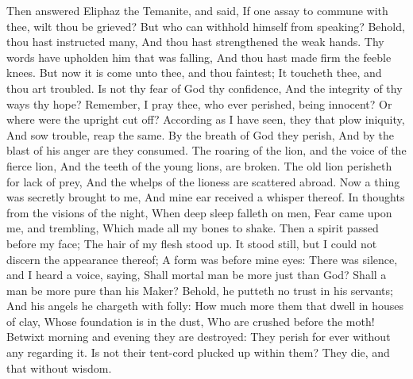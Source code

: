 Then answered Eliphaz the Temanite, and said,  If one assay to commune with thee, wilt thou be grieved? But who can withhold himself from speaking?  Behold, thou hast instructed many, And thou hast strengthened the weak hands.  Thy words have upholden him that was falling, And thou hast made firm the feeble knees.  But now it is come unto thee, and thou faintest; It toucheth thee, and thou art troubled.  Is not thy fear of God thy confidence, And the integrity of thy ways thy hope?  Remember, I pray thee, who ever perished, being innocent? Or where were the upright cut off?  According as I have seen, they that plow iniquity, And sow trouble, reap the same.  By the breath of God they perish, And by the blast of his anger are they consumed.  The roaring of the lion, and the voice of the fierce lion, And the teeth of the young lions, are broken.  The old lion perisheth for lack of prey, And the whelps of the lioness are scattered abroad.  Now a thing was secretly brought to me, And mine ear received a whisper thereof.  In thoughts from the visions of the night, When deep sleep falleth on men,  Fear came upon me, and trembling, Which made all my bones to shake.  Then a spirit passed before my face; The hair of my flesh stood up.  It stood still, but I could not discern the appearance thereof; A form was before mine eyes: There was silence, and I heard a voice, saying,  Shall mortal man be more just than God? Shall a man be more pure than his Maker?  Behold, he putteth no trust in his servants; And his angels he chargeth with folly:  How much more them that dwell in houses of clay, Whose foundation is in the dust, Who are crushed before the moth!  Betwixt morning and evening they are destroyed: They perish for ever without any regarding it.  Is not their tent-cord plucked up within them? They die, and that without wisdom. 

